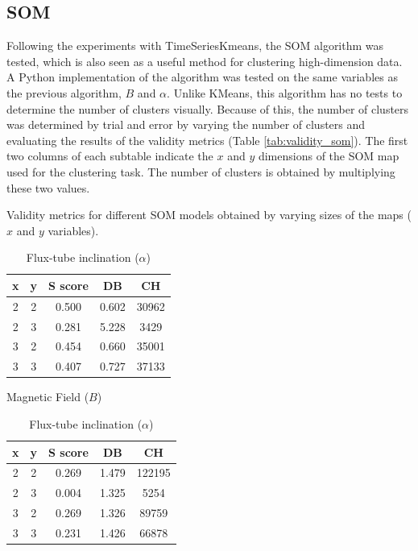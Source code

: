 \subsection{SOM}\label{sec:som_experiments}
Following the experiments with TimeSeriesKmeans, the SOM algorithm was tested, which is also seen as a useful method for clustering high-dimension data. A Python implementation of the algorithm \cite{vettigliminisom} was tested on the same variables as the previous algorithm, $B$ and $\alpha$. Unlike KMeans, this algorithm has no tests to determine the number of clusters visually. Because of this, the number of clusters was determined by trial and error by varying the number of clusters and evaluating the results of the validity metrics (Table \ref{tab:validity_som}). The first two columns of each subtable indicate the $x$ and $y$ dimensions of the SOM map used for the clustering task. The number of clusters is obtained by multiplying these two values.

\begin{table}[]
    \caption[Validity Scores for SOM]{Validity metrics for different SOM models obtained by varying sizes of the maps ($x$ and $y$ variables).}\label{tab:validity_som}
    \begin{subtable}[h]{0.48\textwidth}
        \centering
        \begin{tabular}{@{}ccccc@{}}
            \toprule
            \textbf{x} & \textbf{y} & \textbf{S score} & \textbf{DB} & \textbf{CH} \\ \midrule
            2          & 2          & 0.500            & 0.602       & 30962   \\
            2          & 3          & 0.281            & 5.228       & 3429    \\
            3          & 2          & 0.454            & 0.660       & 35001   \\
            3          & 3          & 0.407            & 0.727       & 37133   \\ \bottomrule
            \end{tabular}
        \caption{Magnetic Field ($B$)}
        \label{tab:som_b}
    \end{subtable}
    \hfill
    \begin{subtable}[h]{0.48\textwidth}
        \centering
        \begin{tabular}{@{}ccccc@{}}
            \toprule
            \textbf{x} & \textbf{y} & \textbf{S score} & \textbf{DB} & \textbf{CH} \\ \midrule
            2          & 2          & 0.269            & 1.479       & 122195 \\
            2          & 3          & 0.004            & 1.325       & 5254    \\
            3          & 2          & 0.269            & 1.326       & 89759   \\
            3          & 3          & 0.231            & 1.426       & 66878   \\ \bottomrule
            \end{tabular}
        \caption{Flux-tube inclination ($\alpha$)}
        \label{tab:som_alpha}
    \end{subtable}
\end{table}

